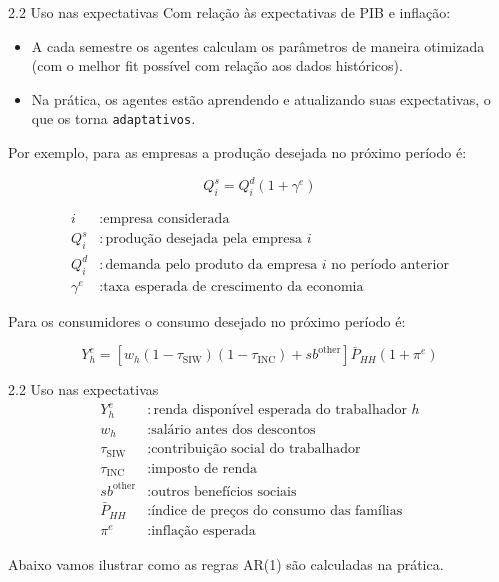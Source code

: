 \documentclass[aspectratio=169,11pt]{beamer}
\begin{document}
\begin{frame}[allowframebreaks]{2.2 Uso nas expectativas}
\normalsize
Com relação às expectativas de PIB e inflação:

\begin{itemize}
\item
  A cada semestre os agentes calculam os parâmetros de maneira otimizada (com o melhor fit possível com relação aos dados históricos).
\item
  Na prática, os agentes estão aprendendo e atualizando suas expectativas, o que os torna \texttt{adaptativos}.
\end{itemize}

Por exemplo, para as empresas a produção desejada no próximo período é:

\[
Q_i^s=Q_i^d(1+\gamma^e)
\]

\[
\begin{aligned}
i &: \text{empresa considerada}\\
Q_i^s &: \text{produção desejada pela empresa }i\\
Q_i^d &: \text{demanda pelo produto da empresa }i\text{ no período anterior}\\
\gamma^e &: \text{taxa esperada de crescimento da economia}
\end{aligned}
\]

Para os consumidores o consumo desejado no próximo período é:

\[
Y_h^e=
\left[w_h(1-\tau_{\mathrm{SIW}})(1-\tau_{\mathrm{INC}})+sb^{\mathrm{other}}\right]
\bar P_{HH}(1+\pi^e)
\]
\end{frame}


\begin{frame}[allowframebreaks]{2.2 Uso nas expectativas}
\normalsize
\[
\begin{aligned}
Y_h^e &: \text{renda disponível esperada do trabalhador }h\\
w_h &: \text{salário antes dos descontos}\\
\tau_{\mathrm{SIW}} &: \text{contribuição social do trabalhador}\\
\tau_{\mathrm{INC}} &: \text{imposto de renda}\\
sb^{\mathrm{other}} &: \text{outros benefícios sociais}\\
\bar P_{HH} &: \text{índice de preços do consumo das famílias}\\
\pi^e &: \text{inflação esperada}
\end{aligned}
\]

Abaixo vamos ilustrar como as regras AR(1) são calculadas na prática.
\end{frame}
\end{document}
